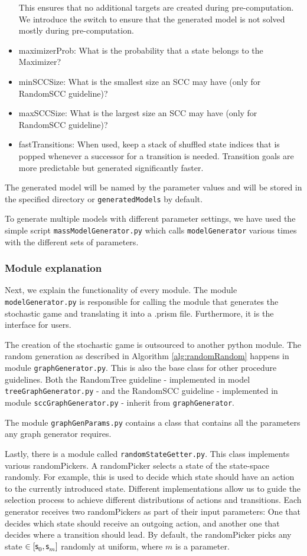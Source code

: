 \begin{itemize}
    This ensures that no additional targets are created during pre-computation. 
    We introduce the switch to ensure that the generated model is not solved mostly during pre-computation.
    \item maximizerProb: What is the probability that a state belongs to the Maximizer?
    \item minSCCSize: What is the smallest size an SCC may have (only for RandomSCC guideline)?
    \item maxSCCSize: What is the largest size an SCC may have (only for RandomSCC guideline)?
    \item fastTransitions: When used, keep a stack of shuffled state indices that is popped whenever a successor for a transition is needed. 
    Transition goals are more predictable but generated significantly faster.
\end{itemize}

The generated model will be named by the parameter values and will be stored in the specified directory or \texttt{generatedModels} by default.

To generate multiple models with different parameter settings, we have used the simple script \texttt{massModelGenerator.py} which calls \texttt{modelGenerator} various times with the different sets of parameters.

\subsubsection*{Module explanation}
Next, we explain the functionality of every module. The module \texttt{modelGenerator.py} is responsible for calling the module that generates the stochastic game and translating it into a .prism file. 
Furthermore, it is the interface for users.

The creation of the stochastic game is outsourced to another python module. The random generation as described in Algorithm \ref{alg:randomRandom} happens in
module \texttt{graphGenerator.py}. This is also the base class for other procedure guidelines. 
Both the RandomTree guideline - implemented in model \texttt{treeGraphGenerator.py} - and the RandomSCC guideline - implemented in module \texttt{sccGraphGenerator.py} - inherit
from \texttt{graphGenerator}.

The module \texttt{graphGenParams.py} contains a class that contains all the parameters any graph generator requires. 

Lastly, there is a module called \texttt{randomStateGetter.py}. This class implements various randomPickers.
A randomPicker selects a state of the state-space randomly.
For example, this is used to decide which state should have an action to the currently introduced state.
Different implementations allow us to guide the selection process to achieve different distributions of actions and transitions.
Each generator receives two randomPickers as part of their input parameters: One that decides which state should receive an outgoing action, 
and another one that decides where a transition should lead. By default, the randomPicker picks any state $\in [\initstate, \state<m>]$ randomly at uniform, where $m$ is a parameter.

